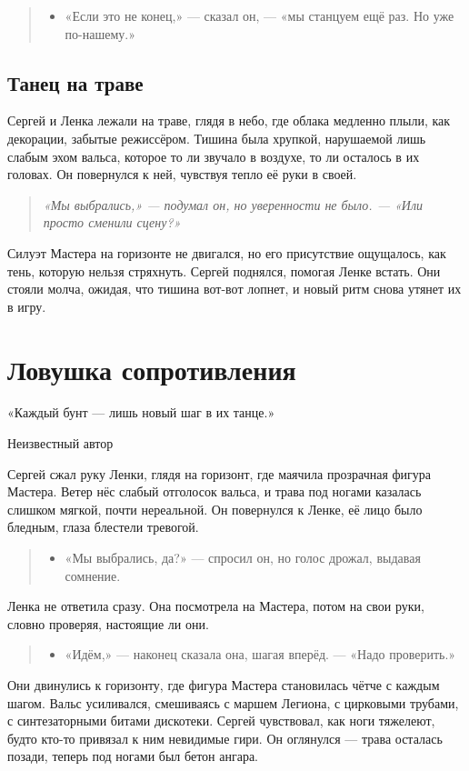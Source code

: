 \documentclass[12pt,a4paper]{book}
\newenvironment{dialogue}{\begin{quote}\itshape\begin{itemize}\item[]}{\end{itemize}\end{quote}}
\newenvironment{innerthought}{\begin{quote}\small\itshape}{\end{quote}}
\begin{document}
\begin{dialogue}
«Если это не конец,» --- сказал он, --- «мы станцуем ещё раз. Но уже по-нашему.»
\end{dialogue}

\section{Танец на траве}

Сергей и Ленка лежали на траве, глядя в небо, где облака медленно плыли, как декорации, забытые режиссёром. Тишина была хрупкой, нарушаемой лишь слабым эхом вальса, которое то ли звучало в воздухе, то ли осталось в их головах. Он повернулся к ней, чувствуя тепло её руки в своей.

\begin{innerthought}
«Мы выбрались,» --- подумал он, но уверенности не было. --- «Или просто сменили сцену?»
\end{innerthought}

Силуэт Мастера на горизонте не двигался, но его присутствие ощущалось, как тень, которую нельзя стряхнуть. Сергей поднялся, помогая Ленке встать. Они стояли молча, ожидая, что тишина вот-вот лопнет, и новый ритм снова утянет их в игру.

\chapter{Ловушка сопротивления}
\epigraph{«Каждый бунт — лишь новый шаг в их танце.»}{Неизвестный автор}

Сергей сжал руку Ленки, глядя на горизонт, где маячила прозрачная фигура Мастера. Ветер нёс слабый отголосок вальса, и трава под ногами казалась слишком мягкой, почти нереальной. Он повернулся к Ленке, её лицо было бледным, глаза блестели тревогой.

\begin{dialogue}
«Мы выбрались, да?» --- спросил он, но голос дрожал, выдавая сомнение.
\end{dialogue}

Ленка не ответила сразу. Она посмотрела на Мастера, потом на свои руки, словно проверяя, настоящие ли они.

\begin{dialogue}
«Идём,» --- наконец сказала она, шагая вперёд. --- «Надо проверить.»
\end{dialogue}

Они двинулись к горизонту, где фигура Мастера становилась чётче с каждым шагом. Вальс усиливался, смешиваясь с маршем Легиона, с цирковыми трубами, с синтезаторными битами дискотеки. Сергей чувствовал, как ноги тяжелеют, будто кто-то привязал к ним невидимые гири. Он оглянулся --- трава осталась позади, теперь под ногами был бетон ангара.
\end{document}
